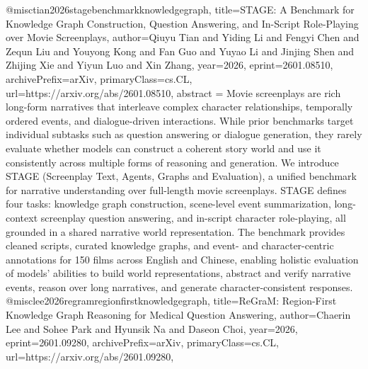 {}@misc{tian2026stagebenchmarkknowledgegraph,
      title={STAGE: A Benchmark for Knowledge Graph Construction, Question Answering, and In-Script Role-Playing over Movie Screenplays}, 
      author={Qiuyu Tian and Yiding Li and Fengyi Chen and Zequn Liu and Youyong Kong and Fan Guo and Yuyao Li and Jinjing Shen and Zhijing Xie and Yiyun Luo and Xin Zhang},
      year={2026},
      eprint={2601.08510},
      archivePrefix={arXiv},
      primaryClass={cs.CL},
      url={https://arxiv.org/abs/2601.08510},
      abstract = {Movie screenplays are rich long-form narratives that interleave complex character relationships, temporally ordered events, and dialogue-driven interactions. While prior benchmarks target individual subtasks such as question answering or dialogue generation, they rarely evaluate whether models can construct a coherent story world and use it consistently across multiple forms of reasoning and generation. We introduce STAGE (Screenplay Text, Agents, Graphs and Evaluation), a unified benchmark for narrative understanding over full-length movie screenplays. STAGE defines four tasks: knowledge graph construction, scene-level event summarization, long-context screenplay question answering, and in-script character role-playing, all grounded in a shared narrative world representation. The benchmark provides cleaned scripts, curated knowledge graphs, and event- and character-centric annotations for 150 films across English and Chinese, enabling holistic evaluation of models' abilities to build world representations, abstract and verify narrative events, reason over long narratives, and generate character-consistent responses.}
}@misc{lee2026regramregionfirstknowledgegraph,
      title={ReGraM: Region-First Knowledge Graph Reasoning for Medical Question Answering}, 
      author={Chaerin Lee and Sohee Park and Hyunsik Na and Daseon Choi},
      year={2026},
      eprint={2601.09280},
      archivePrefix={arXiv},
      primaryClass={cs.CL},
      url={https://arxiv.org/abs/2601.09280},
}
